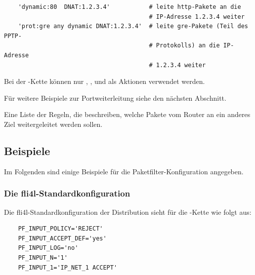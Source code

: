 \begin{example}
{\footnotesize
\begin{verbatim}
    'dynamic:80  DNAT:1.2.3.4'           # leite http-Pakete an die
                                         # IP-Adresse 1.2.3.4 weiter
    'prot:gre any dynamic DNAT:1.2.3.4'  # leite gre-Pakete (Teil des PPTP-
                                         # Protokolls) an die IP-Adresse
                                         # 1.2.3.4 weiter
\end{verbatim}}
\end{example}

Bei der -Kette können nur ,
,  und  als Aktionen
verwendet werden.

Für weitere Beispiele zur Portweiterleitung siehe den nächsten Abschnitt.

\begin{description}

\mbox{}\newline
Eine Liste der Regeln, die beschreiben, welche Pakete vom Router an ein
anderes Ziel weitergeleitet werden sollen.

\end{description}

\subsection{Beispiele}

Im Folgenden sind einige Beispiele für die Paketfilter-Konfiguration angegeben.

\subsubsection{Die fli4l-Standardkonfiguration}

Die fli4l-Standardkonfiguration der Distribution sieht für die
-Kette wie folgt aus:

\begin{example}
\begin{verbatim}
    PF_INPUT_POLICY='REJECT'
    PF_INPUT_ACCEPT_DEF='yes'
    PF_INPUT_LOG='no'
    PF_INPUT_N='1'
    PF_INPUT_1='IP_NET_1 ACCEPT'
\end{verbatim}
\end{example}

